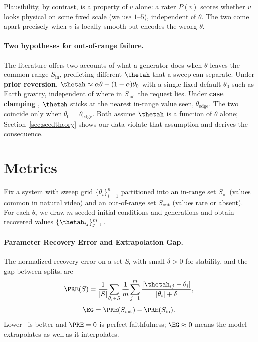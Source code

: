 \documentclass[10pt,twocolumn,letterpaper]{article}
\begin{document}
Plausibility, by contrast, is a property of $v$ alone: a rater $P(v)$
scores whether $v$ looks physical on some fixed scale (we use $1$--$5$),
independent of $\theta$. The two come apart precisely when $v$ is locally
smooth but encodes the wrong $\theta$.

\paragraph{Two hypotheses for out-of-range failure.}
The literature offers two accounts of what a generator does when $\theta$
leaves the common range $S_\text{in}$, predicting different $\thetah$ that a
sweep can separate. Under \textbf{prior reversion},
$\thetah\approx\alpha\theta+(1-\alpha)\theta_0$ with a single fixed default
$\theta_0$ such as Earth gravity, independent of where in $S_\text{out}$ the
request lies. Under \textbf{case clamping} \citep{kang2025howfar}, $\thetah$
sticks at the nearest in-range value seen, $\theta_{\text{edge}}$. The two
coincide only when $\theta_0=\theta_{\text{edge}}$. Both assume $\thetah$ is
a function of $\theta$ alone; Section~\ref{sec:seedtheory} shows our data
violate that assumption and derives the consequence.

\section{Metrics}
\label{sec:metrics}

Fix a system with sweep grid $\{\theta_i\}_{i=1}^{n}$ partitioned into an
in-range set $S_\text{in}$ (values common in natural video) and an
out-of-range set $S_\text{out}$ (values rare or absent). For each $\theta_i$
we draw $m$ seeded initial conditions and generations and obtain recovered
values $\{\thetah_{ij}\}_{j=1}^{m}$.

\paragraph{Parameter Recovery Error and Extrapolation Gap.}
The normalized recovery error on a set $S$, with small $\delta>0$ for
stability, and the gap between splits, are
\begin{equation}
\PRE(S) = \frac{1}{|S|}\!\sum_{\theta_i\in S}\frac{1}{m}\sum_{j=1}^{m}
   \frac{|\thetah_{ij}-\theta_i|}{|\theta_i|+\delta},
\end{equation}
\begin{equation}
\EG = \PRE(S_\text{out})-\PRE(S_\text{in}).
\end{equation}
Lower \PRE\ is better and $\PRE=0$ is perfect faithfulness; $\EG\approx 0$
means the model extrapolates as well as it interpolates.
\end{document}
